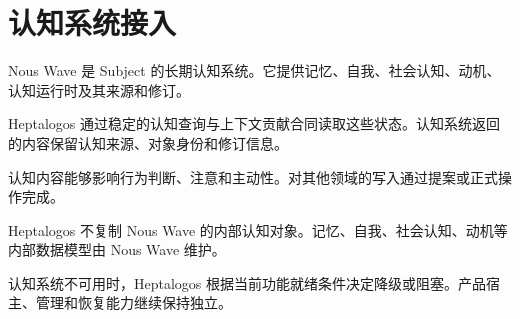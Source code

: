 \chapter{认知系统接入}

Nous Wave 是 Subject 的长期认知系统。它提供记忆、自我、社会认知、动机、认知运行时及其来源和修订。

Heptalogos 通过稳定的认知查询与上下文贡献合同读取这些状态。认知系统返回的内容保留认知来源、对象身份和修订信息。

认知内容能够影响行为判断、注意和主动性。对其他领域的写入通过提案或正式操作完成。

Heptalogos 不复制 Nous Wave 的内部认知对象。记忆、自我、社会认知、动机等内部数据模型由 Nous Wave 维护。

认知系统不可用时，Heptalogos 根据当前功能就绪条件决定降级或阻塞。产品宿主、管理和恢复能力继续保持独立。
